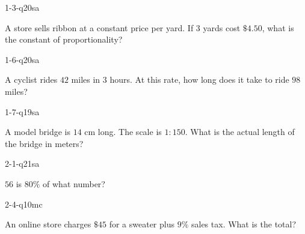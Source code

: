 
\begin{practiceQuestion}{1-3-q20}{sa}
\begin{questionText}
A store sells ribbon at a constant price per yard. If $3$ yards cost $\$4.50$, what is the constant of proportionality?
\end{questionText}
\end{practiceQuestion}

\begin{practiceQuestion}{1-6-q20}{sa}
\begin{questionText}
A cyclist rides $42$ miles in $3$ hours. At this rate, how long does it take to ride $98$ miles?
\end{questionText}
\end{practiceQuestion}

\begin{practiceQuestion}{1-7-q19}{sa}
\begin{questionText}
A model bridge is $14$ cm long. The scale is $1 : 150$. What is the actual length of the bridge in meters?
\end{questionText}
\end{practiceQuestion}

\begin{practiceQuestion}{2-1-q21}{sa}
\begin{questionText}
$56$ is $80\%$ of what number?
\end{questionText}
\end{practiceQuestion}

\begin{practiceQuestion}{2-4-q10}{mc}
\begin{questionText}
An online store charges $\$45$ for a sweater plus $9\%$ sales tax. What is the total?
\end{questionText}
\end{practiceQuestion}

